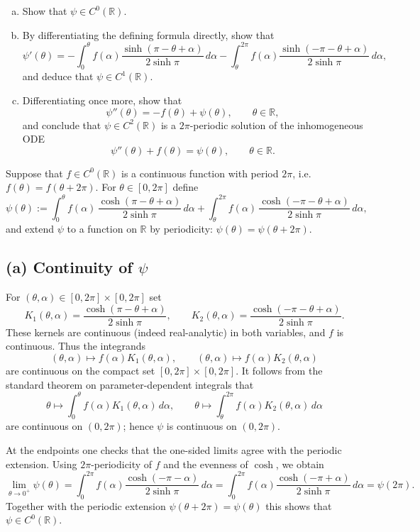 \documentclass[12pt,a4paper]{article}
\theoremstyle{plain}
\theoremstyle{definition}
\theoremstyle{remark}
\theoremstyle{remark}
\begin{document}
\begin{enumerate}[(a)]
	\item Show that $\psi \in C^0(\mathbb{R})$.
	
	\item By differentiating the defining formula directly, show that
	\[
	\psi'(\theta)
	= - \int_{0}^{\theta} f(\alpha)
	\frac{\sinh(\pi - \theta + \alpha)}{2\sinh \pi}\,d\alpha
	- \int_{\theta}^{2\pi} f(\alpha)
	\frac{\sinh(-\pi - \theta + \alpha)}{2\sinh \pi}\,d\alpha,
	\]
	and deduce that $\psi \in C^1(\mathbb{R})$.
	
	\item Differentiating once more, show that
	\[
	\psi''(\theta) = - f(\theta) + \psi(\theta), \qquad \theta\in\mathbb{R},
	\]
	and conclude that $\psi \in C^2(\mathbb{R})$ is a $2\pi$-periodic solution
	of the inhomogeneous ODE
	\[
	\psi''(\theta) + f(\theta) = \psi(\theta), \qquad \theta\in\mathbb{R}.
	\]
\end{enumerate}


Suppose that $f\in C^0(\mathbb{R})$ is a continuous function with period $2\pi$,
i.e.\ $f(\theta)=f(\theta+2\pi)$. For $\theta\in[0,2\pi]$ define
\[
\psi(\theta)
:= \int_0^\theta f(\alpha)\,
\frac{\cosh(\pi-\theta+\alpha)}{2\sinh\pi}\,d\alpha
+ \int_\theta^{2\pi} f(\alpha)\,
\frac{\cosh(-\pi-\theta+\alpha)}{2\sinh\pi}\,d\alpha,
\]
and extend $\psi$ to a function on $\mathbb{R}$ by periodicity:
$\psi(\theta)=\psi(\theta+2\pi)$.

\subsection*{(a) Continuity of $\psi$}

For $(\theta,\alpha)\in[0,2\pi]\times[0,2\pi]$ set
\[
K_1(\theta,\alpha)
=\frac{\cosh(\pi-\theta+\alpha)}{2\sinh\pi},
\qquad
K_2(\theta,\alpha)
=\frac{\cosh(-\pi-\theta+\alpha)}{2\sinh\pi}.
\]
These kernels are continuous (indeed real-analytic) in both variables, and
$f$ is continuous. Thus the integrands
\[
(\theta,\alpha)\mapsto f(\alpha)K_1(\theta,\alpha),\qquad
(\theta,\alpha)\mapsto f(\alpha)K_2(\theta,\alpha)
\]
are continuous on the compact set $[0,2\pi]\times[0,2\pi]$. It follows from
the standard theorem on parameter-dependent integrals that
\[
\theta\mapsto \int_0^\theta f(\alpha)K_1(\theta,\alpha)\,d\alpha,
\qquad
\theta\mapsto \int_\theta^{2\pi} f(\alpha)K_2(\theta,\alpha)\,d\alpha
\]
are continuous on $(0,2\pi)$; hence $\psi$ is continuous on $(0,2\pi)$.

At the endpoints one checks that the one-sided limits agree with the
periodic extension. Using $2\pi$-periodicity of $f$ and the evenness of
$\cosh$, we obtain
\[
\lim_{\theta\to 0^+}\psi(\theta)
=\int_0^{2\pi} f(\alpha)\frac{\cosh(-\pi-\alpha)}{2\sinh\pi}\,d\alpha
=\int_0^{2\pi} f(\alpha)\frac{\cosh(-\pi+\alpha)}{2\sinh\pi}\,d\alpha
=\psi(2\pi).
\]
Together with the periodic extension $\psi(\theta+2\pi)=\psi(\theta)$ this
shows that $\psi\in C^0(\mathbb{R})$.
\end{document}

